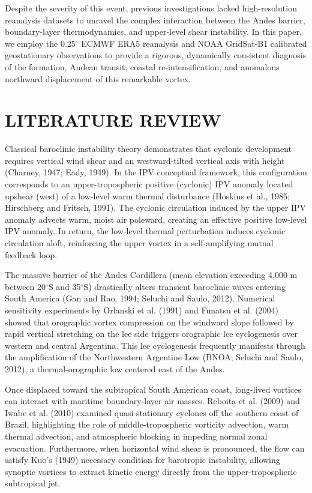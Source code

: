 \documentclass[twocolumn,a4paper,10pt]{article}
\begin{document}
Despite the severity of this event, previous investigations lacked high-resolution reanalysis datasets to unravel the complex interaction between the Andes barrier, boundary-layer thermodynamics, and upper-level shear instability. In this paper, we employ the 0.25$^\circ$ ECMWF ERA5 reanalysis and NOAA GridSat-B1 calibrated geostationary observations to provide a rigorous, dynamically consistent diagnosis of the formation, Andean transit, coastal re-intensification, and anomalous northward displacement of this remarkable vortex.

\section{LITERATURE REVIEW}
Classical baroclinic instability theory demonstrates that cyclonic development requires vertical wind shear and an westward-tilted vertical axis with height (Charney, 1947; Eady, 1949). In the IPV conceptual framework, this configuration corresponds to an upper-tropospheric positive (cyclonic) IPV anomaly located upshear (west) of a low-level warm thermal disturbance (Hoskins et al., 1985; Hirschberg and Fritsch, 1991). The cyclonic circulation induced by the upper IPV anomaly advects warm, moist air poleward, creating an effective positive low-level IPV anomaly. In return, the low-level thermal perturbation induces cyclonic circulation aloft, reinforcing the upper vortex in a self-amplifying mutual feedback loop.

The massive barrier of the Andes Cordillera (mean elevation exceeding 4,000 m between 20$^\circ$S and 35$^\circ$S) drastically alters transient baroclinic waves entering South America (Gan and Rao, 1994; Seluchi and Saulo, 2012). Numerical sensitivity experiments by Orlanski et al. (1991) and Funatsu et al. (2004) showed that orographic vortex compression on the windward slope followed by rapid vertical stretching on the lee side triggers orographic lee cyclogenesis over western and central Argentina. This lee cyclogenesis frequently manifests through the amplification of the Northwestern Argentine Low (BNOA; Seluchi and Saulo, 2012), a thermal-orographic low centered east of the Andes.

Once displaced toward the subtropical South American coast, long-lived vortices can interact with maritime boundary-layer air masses. Reboita et al. (2009) and Iwabe et al. (2010) examined quasi-stationary cyclones off the southern coast of Brazil, highlighting the role of middle-tropospheric vorticity advection, warm thermal advection, and atmospheric blocking in impeding normal zonal evacuation. Furthermore, when horizontal wind shear is pronounced, the flow can satisfy Kuo's (1949) necessary condition for barotropic instability, allowing synoptic vortices to extract kinetic energy directly from the upper-tropospheric subtropical jet.
\end{document}

